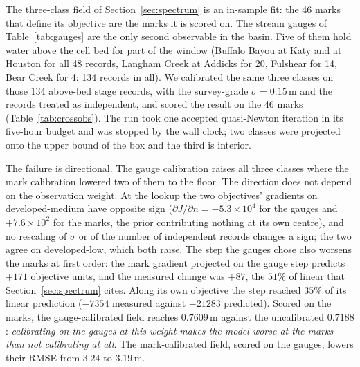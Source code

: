 \documentclass[11pt]{article}
\begin{document}
The three-class field of Section~\ref{sec:spectrum} is an in-sample
fit: the 46 marks that define its objective are the marks it is
scored on. The stream gauges of Table~\ref{tab:gauges} are the only
second observable in the basin. Five of them hold water above the
cell bed for part of the window (Buffalo Bayou at Katy and at Houston
for all 48 records, Langham Creek at Addicks for 20, Fulshear for 14,
Bear Creek for 4: 134 records in all). We calibrated the same three
classes on those 134 above-bed stage records, with the survey-grade
$\sigma = 0.15$\,m and the records treated as independent, and scored
the result on the 46 marks (Table~\ref{tab:crossobs}). The run took
one accepted quasi-Newton iteration in its five-hour budget and was
stopped by the wall clock; two classes were projected onto the upper
bound of the box and the third is interior.

The failure is directional. The gauge calibration raises all three
classes where the mark calibration lowered two of them to the floor.
The direction does not depend on the observation weight. At the
lookup the two objectives' gradients on developed-medium have opposite
sign ($\partial J/\partial n = -5.3\times10^{4}$ for the gauges and
$+7.6\times10^{2}$ for the marks, the prior contributing nothing at
its own centre), and no rescaling of $\sigma$ or of the number of
independent records changes a sign; the two agree on developed-low,
which both raise. The step the gauges chose also worsens the marks at
first order: the mark gradient projected on the gauge step predicts
$+171$ objective units, and the measured change was $+87$, the $51\%$
of linear that Section~\ref{sec:spectrum} cites. Along its own
objective the step reached $35\%$ of its linear prediction ($-7354$
measured against $-21283$ predicted). Scored on
the marks, the gauge-calibrated field reaches $0.7609$\,m against the
uncalibrated $0.7188$: \emph{calibrating on the gauges at this weight
makes the model worse at the marks than not calibrating at all}. The
mark-calibrated field, scored on the gauges, lowers their RMSE from
$3.24$ to $3.19$\,m.
\end{document}
